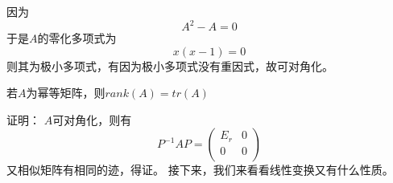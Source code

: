 \documentclass[lang=cn,10pt]{elegantbook}
\begin{document}
因为
\begin{equation*}
	A^{2}-A=0
\end{equation*}
于是$A$的零化多项式为
\begin{equation*}
	x(x-1)=0
\end{equation*}
则其为极小多项式，有因为极小多项式没有重因式，故可对角化。
\begin{example}
	若$A$为幂等矩阵，则$rank(A)=tr(A)$
\end{example}
证明：
$A$可对角化，则有
\begin{equation*}
	P^{-1}AP=\left( \begin{matrix}
		E_r&		0\\
		0&		0\\
	\end{matrix} \right) 
\end{equation*}
又相似矩阵有相同的迹，得证。
接下来，我们来看看线性变换又有什么性质。
\end{document}
